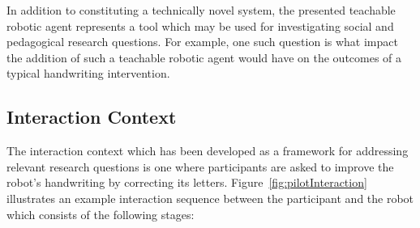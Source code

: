 \documentclass{sig-alternate}
\begin{document}
In addition to constituting a technically novel system, the presented teachable
robotic agent represents a tool which may be used for investigating social and
pedagogical research questions. For example, one such question is what impact the addition of
such a teachable robotic agent would have on the outcomes of a typical
handwriting intervention. 

\subsection{Interaction Context}

The interaction context which has been developed as a framework for addressing
relevant research questions is one where participants are asked to improve the robot's
handwriting by correcting its letters. Figure~\ref{fig:pilotInteraction}
illustrates an example interaction sequence between the participant and the
robot which consists of the following stages:
\end{document}
